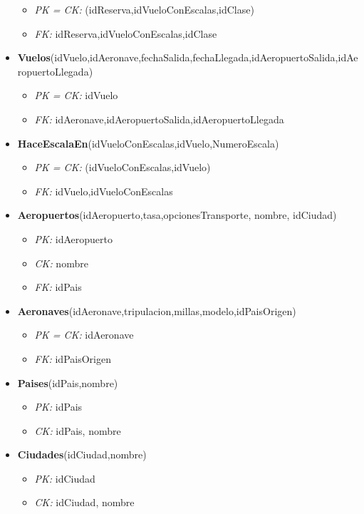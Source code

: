 \begin{itemize}
		\begin{itemize}
			\item \textit{PK = CK: } (idReserva,idVueloConEscalas,idClase)
			\item \textit{FK: } idReserva,idVueloConEscalas,idClase
		\end{itemize}
	\item \textbf{Vuelos}(idVuelo,idAeronave,fechaSalida,fechaLlegada,idAeropuertoSalida,idAeropuertoLlegada)
		\begin{itemize}
			\item \textit{PK = CK:} idVuelo
			\item \textit{FK: } idAeronave,idAeropuertoSalida,idAeropuertoLlegada
		\end{itemize}
	\item \textbf{HaceEscalaEn}(idVueloConEscalas,idVuelo,NumeroEscala)
		\begin{itemize}
			\item \textit{PK = CK:} (idVueloConEscalas,idVuelo)
			\item \textit{FK: } idVuelo,idVueloConEscalas
		\end{itemize}
	\item \textbf{Aeropuertos}(idAeropuerto,tasa,opcionesTransporte, nombre, idCiudad)
		\begin{itemize}
			\item \textit{PK: } idAeropuerto
			\item \textit{CK: } nombre
			\item \textit{FK: } idPais
		\end{itemize}
	\item \textbf{Aeronaves}(idAeronave,tripulacion,millas,modelo,idPaisOrigen)
		\begin{itemize}
			\item \textit{PK = CK: } idAeronave
			\item \textit{FK: } idPaisOrigen
		\end{itemize}
	\item \textbf{Paises}(idPais,nombre)
		\begin{itemize}
			\item \textit{PK: } idPais
			\item \textit{CK: } idPais, nombre
		\end{itemize}
	\item \textbf{Ciudades}(idCiudad,nombre)
		\begin{itemize}
			\item \textit{PK: } idCiudad
			\item \textit{CK: } idCiudad, nombre

\end{itemize}
\end{itemize}

